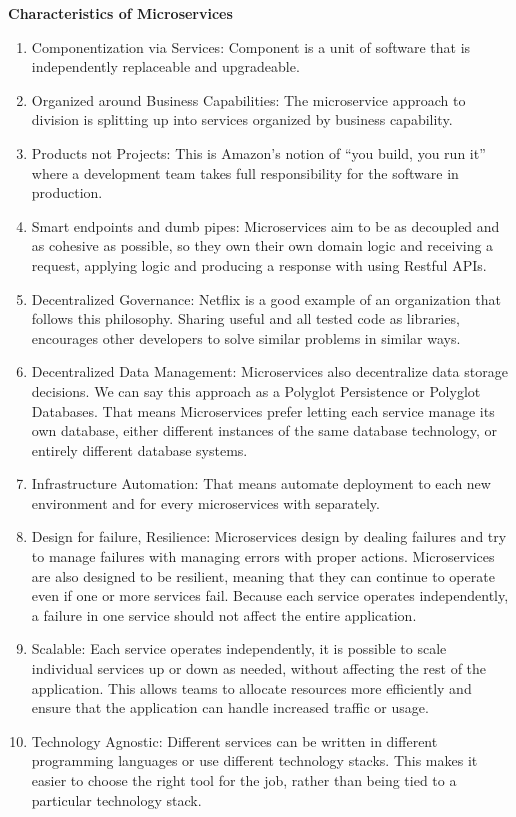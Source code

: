 \textbf{Characteristics of Microservices}
\begin{enumerate}
    \item Componentization via Services: Component is a unit of software that is independently replaceable and upgradeable.

    \item Organized around Business Capabilities: The microservice approach to division is splitting up into services organized by business capability.
    
    \item Products not Projects: This is Amazon’s notion of “you build, you run it” where a development team takes full responsibility for the software in production.
    
    \item Smart endpoints and dumb pipes: Microservices aim to be as decoupled and as cohesive as possible, so they own their own domain logic and receiving a request, applying logic and producing a response with using Restful APIs.
    
    \item Decentralized Governance: Netflix is a good example of an organization that follows this philosophy. Sharing useful and all tested code as libraries, encourages other developers to solve similar problems in similar ways.

    \item Decentralized Data Management: Microservices also decentralize data storage decisions. We can say this approach as a Polyglot Persistence or Polyglot Databases. That means Microservices prefer letting each service manage its own database, either different instances of the same database technology, or entirely different database systems.

    \item Infrastructure Automation: That means automate deployment to each new environment and for every microservices with separately.

    \item Design for failure, Resilience: Microservices design by dealing failures and try to manage failures with managing errors with proper actions. Microservices are also designed to be resilient, meaning that they can continue to operate even if one or more services fail. Because each service operates independently, a failure in one service should not affect the entire application.

    \item Scalable: Each service operates independently, it is possible to scale individual services up or down as needed, without affecting the rest of the application. This allows teams to allocate resources more efficiently and ensure that the application can handle increased traffic or usage.

    \item Technology Agnostic: Different services can be written in different programming languages or use different technology stacks. This makes it easier to choose the right tool for the job, rather than being tied to a particular technology stack.
\end{enumerate}

